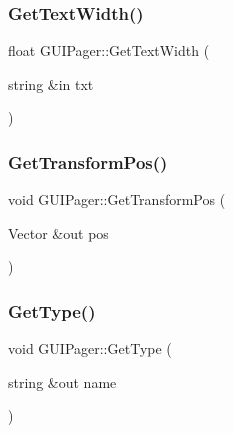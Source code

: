 \hypertarget{class_g_u_i_pager_a34ae16f1d28e24a68d939410d477f441}{}\label{class_g_u_i_pager_a34ae16f1d28e24a68d939410d477f441} 
\subsubsection{\texorpdfstring{Get\+Text\+Width()}{GetTextWidth()}}
{\footnotesize\ttfamily float G\+U\+I\+Pager\+::\+Get\+Text\+Width (\begin{DoxyParamCaption}\item[{string \&in}]{txt }\end{DoxyParamCaption})}

\hypertarget{class_g_u_i_pager_aae2bd03930b3010d724def60f39a6e9f}{}\label{class_g_u_i_pager_aae2bd03930b3010d724def60f39a6e9f} 
\subsubsection{\texorpdfstring{Get\+Transform\+Pos()}{GetTransformPos()}}
{\footnotesize\ttfamily void G\+U\+I\+Pager\+::\+Get\+Transform\+Pos (\begin{DoxyParamCaption}\item[{Vector \&out}]{pos }\end{DoxyParamCaption})}

\hypertarget{class_g_u_i_pager_ac157fffcad04420ec6a7174866211031}{}\label{class_g_u_i_pager_ac157fffcad04420ec6a7174866211031} 
\subsubsection{\texorpdfstring{Get\+Type()}{GetType()}}
{\footnotesize\ttfamily void G\+U\+I\+Pager\+::\+Get\+Type (\begin{DoxyParamCaption}\item[{string \&out}]{name }\end{DoxyParamCaption})}

\hypertarget{class_g_u_i_pager_a00580fe0d18d1cb58283e8b6dcd709b3}{}\label{class_g_u_i_pager_a00580fe0d18d1cb58283e8b6dcd709b3} 
